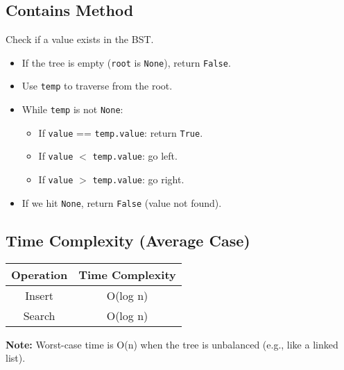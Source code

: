 \documentclass{thesisnotes}
\begin{document}
\subsection*{Contains Method}
Check if a value exists in the BST.
\begin{itemize}
    \item If the tree is empty (\texttt{root} is \texttt{None}), return \texttt{False}.
    \item Use \texttt{temp} to traverse from the root.
    \item While \texttt{temp} is not \texttt{None}:
    \begin{itemize}
        \item If \texttt{value} == \texttt{temp.value}: return \texttt{True}.
        \item If \texttt{value} $<$ \texttt{temp.value}: go left.
        \item If \texttt{value} $>$ \texttt{temp.value}: go right.
    \end{itemize}
    \item If we hit \texttt{None}, return \texttt{False} (value not found).
\end{itemize}

\subsection{Time Complexity (Average Case)}

\begin{tabular}{|c|c|}
\hline
Operation & Time Complexity \\
\hline
Insert    & O(log n) \\
Search    & O(log n) \\
\hline
\end{tabular}

\textbf{Note:} Worst-case time is O(n) when the tree is unbalanced (e.g., like a linked list).
\end{document}
